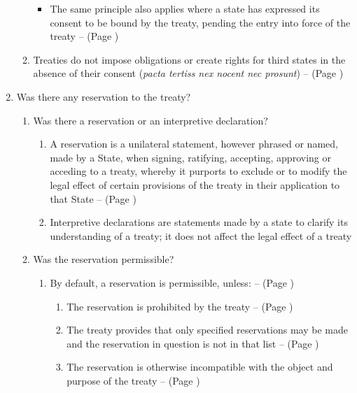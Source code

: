 \begin{enumerate}
\begin{enumerate}
        \begin{itemize}
            \item The same principle also applies where a state has expressed its consent to be bound by the treaty, pending the entry into force of the treaty --  (Page \pageref{VCLT Art 18})
        \end{itemize}
        \item Treaties do not impose obligations or create rights for third states in the absence of their consent (\textit{pacta tertiss nex nocent nec prosunt}) --  (Page \pageref{VCLT Art 34})
    \end{enumerate}
    \item Was there any reservation to the treaty?
    \begin{enumerate}
        \item Was there a reservation or an interpretive declaration?
        \begin{enumerate}
            \item A reservation is a unilateral statement, however phrased or named, made by a State, when signing, ratifying, accepting, approving or acceding to a treaty, whereby it purports to exclude or to modify the legal effect of certain provisions of the treaty in their application to that State --  (Page \pageref{VCLT Art 2})
            \item Interpretive declarations are statements made by a state to clarify its understanding of a treaty; it does not affect the legal effect of a treaty
        \end{enumerate}
        \item Was the reservation permissible?
        \begin{enumerate}
            \item By default, a reservation is permissible, unless: --  (Page \pageref{VCLT Art 19})
            \begin{enumerate}
                \item The reservation is prohibited by the treaty --  (Page \pageref{VCLT Art 19})
                \item The treaty provides that only specified reservations may be made and the reservation in question is not in that list --  (Page \pageref{VCLT Art 19})
                \item The reservation is otherwise incompatible with the object and purpose of the treaty --  (Page \pageref{VCLT Art 19})

\end{enumerate}
\end{enumerate}
\end{enumerate}
\end{enumerate}
